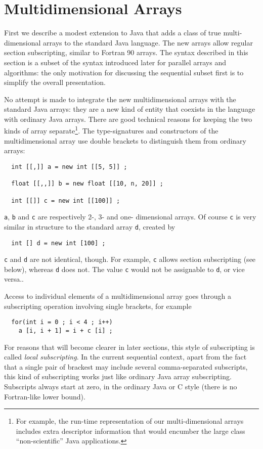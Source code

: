 \section{Multidimensional Arrays\label{multiDim}}

First we describe a modest extension to Java that adds a class of true
multi-dimensional arrays to the standard Java language.  The new arrays
allow regular section subscripting, similar to Fortran 90 arrays.  The
syntax described in this section is a subset of the syntax introduced
later for parallel arrays and algorithms: the only motivation for
discussing the sequential subset first is to simplify the overall
presentation.

No attempt is made to integrate the new multidimensional arrays
with the standard Java arrays: they are a new kind of entity that
coexists in the language with ordinary Java arrays.  There
are good technical reasons for keeping the two kinds of array
separate\footnote{For example, the run-time representation of our
multi-dimensional arrays includes extra descriptor information that would
encumber the large class ``non-scientific'' Java applications.}.
The type-signatures and constructors of the multidimensional array use
double brackets to distinguish them from ordinary arrays:
\small
\begin{verbatim}
  int [[,]] a = new int [[5, 5]] ;

  float [[,,]] b = new float [[10, n, 20]] ;

  int [[]] c = new int [[100]] ;
\end{verbatim}
\normalsize
{\tt a}, {\tt b} and {\tt c} are respectively 2-, 3- and one- dimensional
arrays.  Of course {\tt c} is very similar in structure to the standard
array {\tt d}, created by
\small
\begin{verbatim}
  int [] d = new int [100] ;
\end{verbatim}
\normalsize
{\tt c} and {\tt d} are not identical, though.  For example,
{\tt c} allows section subscripting (see below), whereas {\tt d} does
not.  The value {\tt c} would not be assignable to {\tt d}, or vice
versa..

Access to individual elements of a multidimensional array goes through
a subscripting operation involving single brackets, for example
\small
\begin{verbatim}
  for(int i = 0 ; i < 4 ; i++)
    a [i, i + 1] = i + c [i] ;
\end{verbatim}
\normalsize
For reasons that will become clearer in later sections, this style of
subscripting is called {\em local subscripting}.  In the current
sequential context, apart from the fact that a single pair of brackest
may include several comma-separated subscripts, this kind of
subscripting works just like ordinary Java array subscripting.
Subscripts always start at zero, in the ordinary Java or C style (there
is no Fortran-like lower bound).


